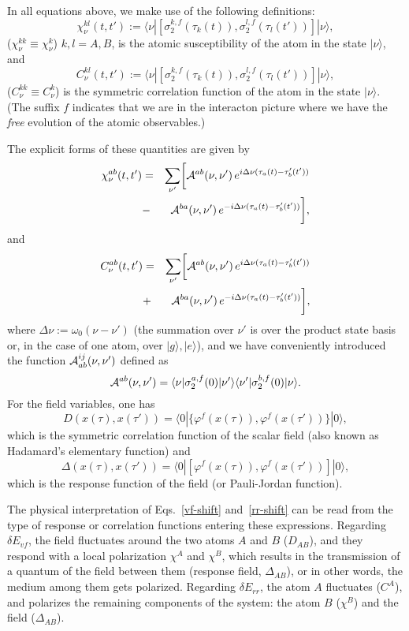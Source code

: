 \documentclass[twocolumn,prd,aps,showpacs,amsmath,amssymb]{revtex4-1}
\def\beq{\begin{equation}}
\def\eeq{\end{equation}}
\def\bea{\begin{eqnarray}}
\def\eea{\end{eqnarray}}
\def\nn{\nonumber}
\begin{document}
In all equations above, we make use of the following definitions:
%
\beq
\chi^{kl}_{\nu}(t,t') := \langle \nu | [\sigma_{2}^{k,f}(\tau_{k}(t)),\sigma_{2}^{l,f}(\tau_{l}(t'))]| \nu \rangle,
\label{susa}
\eeq
%
($\chi^{kk}_{\nu} \equiv \chi^{k}_{\nu}$) $k,l = A, B$, is the atomic susceptibility of the atom in the state $|\nu\rangle$, and
%
\beq
C^{kl}_{\nu}(t,t') := \langle \nu | [\sigma_{2}^{k,f}(\tau_{k}(t)),\sigma_{2}^{l,f}(\tau_{l}(t'))]| \nu \rangle,
\eeq
%
($C^{kk}_{\nu} \equiv C^{k}_{\nu}$) is the symmetric correlation
function of the atom in the state $|\nu\rangle$. (The suffix $f$
indicates that we are in the interacton picture where we have the
{\em free} evolution of the atomic observables.)

The explicit forms of these quantities are given by 
%
\bea
\chi^{ab}_{\nu}(t,t') &=& \sum_{\nu'} \biggl[{\cal A}^{ab}(\nu, \nu')\,e^{i\Delta\nu(\tau_a(t) - \tau_b'(t'))} 
\nn\\
&-&\,{\cal A}^{ba}(\nu, \nu')\,e^{-i\Delta\nu(\tau_a(t) - \tau_b'(t'))}\biggr],
\label{susa1-scalar}
\eea
%
and
%
\bea
C^{ab}_{\nu}(t,t') &=& \sum_{\nu'} \biggl[{\cal A}^{ab}(\nu, \nu')\,e^{i\Delta\nu(\tau_a(t) - \tau_b'(t'))} 
\nn\\
&+&\, {\cal A}^{ba}(\nu, \nu')\,e^{-i\Delta\nu(\tau_a(t) - \tau_b'(t'))}\biggr],
\label{cora1-scalar}
\eea
%
where $\Delta \nu :=\omega_0( \nu - \nu')$ (the summation over $\nu'$
is over the product state basis or, in the case of one atom, over
$|g\rangle,|e\rangle$), and we have conveniently introduced the
function ${\cal A}_{ab}^{ij}(\nu, \nu')$ defined as 
%
\beq
{\cal A}^{ab}(\nu, \nu') =  \langle \nu |\sigma_{2}^{a,f}(0)| \nu' \rangle\langle \nu' |\sigma_{2}^{b,f}(0)| \nu \rangle.
\label{aa}
\eeq
%
For the field variables, one has
%
\beq
D(x(\tau),x(\tau')) = \langle 0 |\{\varphi^{f}(x(\tau)),\varphi^{f}(x(\tau'))\}| 0 \rangle,
\label{hada}
\eeq
%
which is the symmetric correlation function of the scalar field (also
known as Hadamard's elementary function) and  
%
\beq
\Delta(x(\tau),x(\tau')) = \langle 0 |[\varphi^{f}(x(\tau)),\varphi^{f}(x(\tau'))]| 0 \rangle,
\label{pauli}
\eeq
%
which is the response function of the field (or Pauli-Jordan function). 

The physical interpretation of Eqs.~\eqref{vf-shift}
and~\eqref{rr-shift} can be read from the type of response or
correlation functions entering these expressions. Regarding $\delta
E_{vf}$, the field fluctuates around the two atoms $A$ and $B$
($D_{AB}$), and they respond with a local polarization $\chi^{A}$ and
$\chi^B$, which results in the transmission of a quantum of the field
between them (response field, $\Delta_{AB}$), or in other words, the
medium among them gets polarized. Regarding $\delta E_{rr}$, the atom
$A$ fluctuates ($C^A$), and polarizes the remaining components of the
system: the atom $B$ ($\chi^B$) and the field ($\Delta_{AB}$). 
\end{document}
